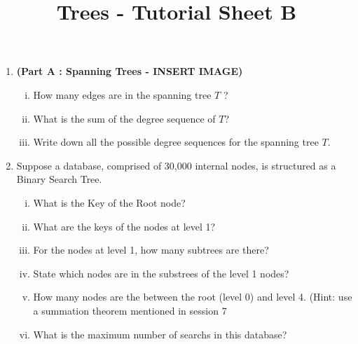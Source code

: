 \documentclass[]{article}
\title{Trees - Tutorial Sheet B}
\begin{document}
\begin{enumerate}
\item  \textbf{(Part A : Spanning Trees -  INSERT IMAGE) }\\

\begin{enumerate}[(i)]
\item How many edges are in the spanning tree $T$ ?
\item What is the sum of the degree sequence of $T$?
\item Write down all the possible degree sequences for the spanning tree $T$.
\end{enumerate}
\item 
Suppose a database, comprised of 30,000 internal nodes, is structured as a Binary Search Tree.

\begin{enumerate}[(i)]
\item What is the Key of the Root node?
\item What are the keys of the nodes at level 1?
\item For the nodes at level 1, how many subtrees are there?
\item State which nodes are in the substrees of the level 1 nodes?
\item How many nodes are the between the root (level 0) and level 4. 
(Hint: use a summation theorem mentioned in session 7
\item What is the maximum number of searchs in this database?
\end{enumerate}


\end{enumerate}
\end{document}
